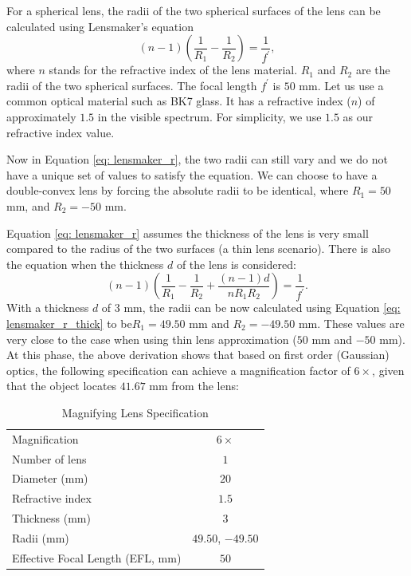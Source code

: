 For a spherical lens, the radii of the two spherical surfaces of the lens can be calculated using Lensmaker's equation 
\begin{equation} \label{eq: lensmaker_r}
    (n-1)(\frac{1}{R_1} - \frac{1}{R_2}) = \frac{1}{f^\prime},
\end{equation}
where $n$ stands for the refractive index of the lens material. $R_1$ and $R_2$ are the radii of the two spherical surfaces. The focal length $f^\prime$ is $50 $ mm. Let us use a common optical material such as BK7 glass. It has a refractive index ($n$) of approximately $1.5$ in the visible spectrum. For simplicity, we use $1.5$ as our refractive index value.

Now in Equation \ref{eq: lensmaker_r}, the two radii can still vary and we do not have a unique set of values to satisfy the equation. We can choose to have a double-convex lens by forcing the absolute radii to be identical, where $R_1 = 50 $ mm, and $R_2 = -50 $ mm. 

Equation \ref{eq: lensmaker_r} assumes the thickness of the lens is very small compared to the radius of the two surfaces (a thin lens scenario). There is also the equation when the thickness $d$ of the lens is considered:
\begin{equation} \label{eq: lensmaker_r_thick}
    (n-1)\left( \frac{1}{R_1} - \frac{1}{R_2} + \frac{(n-1)d}{nR_1R_2} \right) = \frac{1}{f^\prime}  .
\end{equation}
With a thickness $d$ of $3 $ mm, the radii can be now calculated using Equation \ref{eq: lensmaker_r_thick} to be$R_1 =  49.50 $ mm and $R_2 = -49.50 $ mm. These values are very close to the case when using thin lens approximation ($50 $ mm and $-50 $ mm). 
At this phase, the above derivation shows that based on first order (Gaussian) optics, the following specification can achieve a magnification factor of $6\times$, given that the object locates $41.67 $ mm from the lens:

\begin{table}[h!]
    \centering
    \captionsetup{justification=centering}
    \caption{Magnifying Lens Specification}
    \label{magnifying lens specs}
    \vspace{-1em}
    \begin{tabular}{ p{15em}  c }
    \hline 
    Magnification & $6\times$\\ 
    Number of lens & $1$\\ 
    Diameter (mm) & $20$ \\ 
    Refractive index & $1.5$\\ 
    Thickness (mm)& $3$\\ 
    Radii (mm) & $49.50$, $-49.50$\\
    Effective Focal Length (EFL, mm) & $50$\\
    \hline
    \end{tabular}
\end{table}
 
